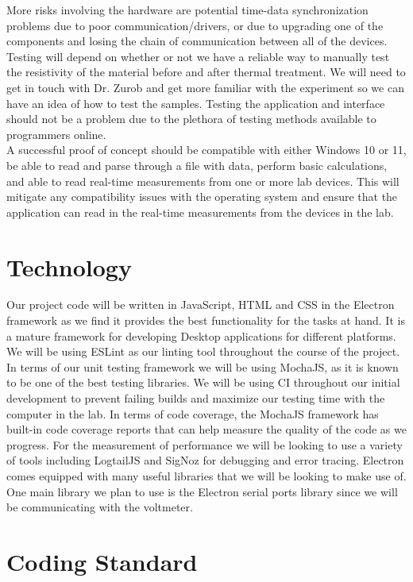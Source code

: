 \documentclass{article}
\begin{document}
\noindent More risks involving the hardware are potential time-data synchronization problems due to poor communication/drivers, or due to upgrading one of the components and losing the chain of communication between all of the devices. 
Testing will depend on whether or not we have a reliable way to manually test the resistivity of the material before and after thermal treatment. We will need to get in touch with Dr. Zurob and get more familiar with the experiment so we can have an idea of how to test the samples. Testing the application and interface should not be a problem due to the plethora of testing methods available to programmers online. \\

\noindent A successful proof of concept should be compatible with either Windows 10 or 11, 
be able to read and parse through a file with data, perform basic calculations, and able to read real-time measurements from one or more lab devices. 
This will mitigate any compatibility issues with the operating system and ensure that the application can read in the real-time measurements from the devices in the lab.

\section{Technology}


Our project code will be written in JavaScript, HTML and CSS in the Electron framework as 
we find it provides the best functionality for the tasks at hand. It is a mature framework for developing Desktop applications for different platforms.
We will be using ESLint as our linting tool throughout the course of the project. In terms of our unit testing 
framework we will be using MochaJS, as it is known to be one of the best testing libraries. 
We will be using CI throughout our initial development to prevent failing builds and maximize our testing time with the computer in the lab. In terms of code coverage, the MochaJS 
framework has built-in code coverage reports that can help measure the quality of the code as we progress. For the
measurement of performance we will be looking to use a variety of tools including LogtailJS and SigNoz 
for debugging and error tracing. Electron comes equipped with many useful libraries that we 
will be looking to make use of. One main library we plan to use is the Electron serial ports library since we will be communicating with the voltmeter.
  
\section{Coding Standard}
  
\end{document}
